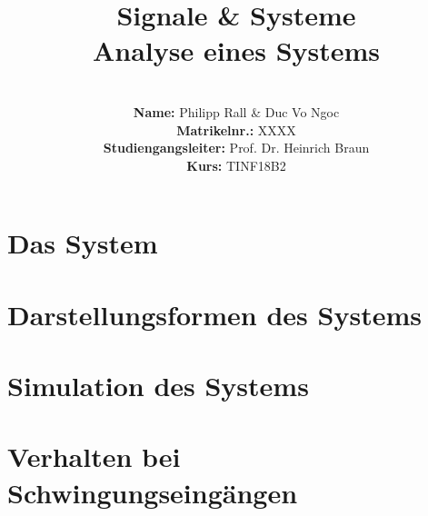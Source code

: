\documentclass{article}
\title{\textbf{Signale \& Systeme \\ Analyse eines Systems}}
\author{
\vspace{8em} \\
\textbf{Name:} Philipp Rall \& Duc Vo Ngoc \\
\textbf{Matrikelnr.:} XXXX   \\
\textbf{Studiengangsleiter:} Prof. Dr. Heinrich Braun\\
\textbf{Kurs:} TINF18B2 \\
\vspace{8em} 
}
\begin{document}
\maketitle
\newpage
\section{Das System}



\section{Darstellungsformen des Systems}



\section{Simulation des Systems}





\section{Verhalten bei Schwingungseingängen}



\end{document}
